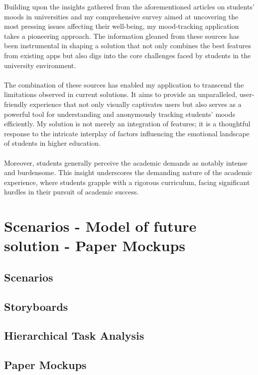 \documentclass[11pt]{report}
\begin{document}
Building upon the insights gathered from the aforementioned articles on students' moods in universities and my comprehensive survey aimed at uncovering the most pressing issues affecting their well-being, my mood-tracking application takes a pioneering approach. The information gleaned from these sources has been instrumental in shaping a solution that not only combines the best features from existing apps but also digs into the core challenges faced by students in the university environment.\\ \\
The combination of these sources has enabled my application to transcend the limitations observed in current solutions. It aims to provide an unparalleled, user-friendly experience that not only visually captivates users but also serves as a powerful tool for understanding and anonymously tracking students' moods efficiently. My solution is not merely an integration of features; it is a thoughtful response to the intricate interplay of factors influencing the emotional landscape of students in higher education.\\ \\
Moreover, students generally perceive the academic demands as notably intense and burdensome. This insight underscores the demanding nature of the academic experience, where students grapple with a rigorous curriculum, facing significant hurdles in their pursuit of academic success.


\chapterfont{\LARGE \centering}
\chaptertitlefont{\Large \centering}
\chapter{Scenarios - Model of future solution - Paper Mockups}

\section{Scenarios}

\section{Storyboards}

\section{Hierarchical Task Analysis}

\section{Paper Mockups}
\end{document}
